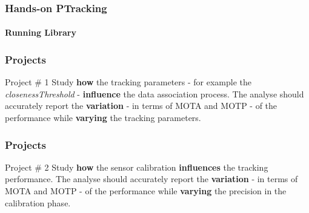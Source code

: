 \begin{frame}
	\frametitle{Hands-on PTracking}
	\framesubtitle{Running Library}
	
	\Large
	
	
\end{frame}

\begin{frame}
	\frametitle{Projects}
	
	\LARGE
	
	\begin{block}{Project \# 1}
		Study \textbf{how} the tracking parameters - for example the \emph{closenessThreshold} -
		\textbf{influence} the data association process. The analyse should accurately report the
		\textbf{variation} - in terms of MOTA and MOTP - of the performance while \textbf{varying} the
		tracking parameters.
	\end{block}
\end{frame}

\begin{frame}
	\frametitle{Projects}
	
	\LARGE
	
	\begin{block}{Project \# 2}
		Study \textbf{how} the sensor calibration \textbf{influences} the tracking performance. The
		analyse should accurately report the \textbf{variation} - in terms of MOTA and MOTP - of the
		performance while \textbf{varying} the precision in the calibration phase.
	\end{block}
\end{frame}
